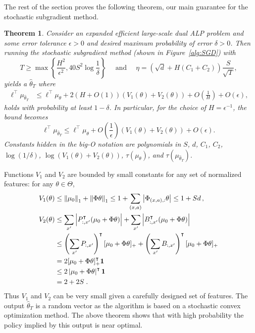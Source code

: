 \documentclass[11pt]{article}
\newtheorem{theorem}{Theorem}
\begin{document}
The rest of the section proves the following theorem, our main guarantee for the stochastic subgradient method.
\begin{theorem}
\label{thm:main_average}
Consider an expanded efficient large-scale dual ALP problem and some error tolerance $\epsilon>0$ and desired maximum probability of error $\delta>0$. Then running the stochastic subgradient method (shown in Figure~\ref{alg:SGD}) with
\[
T\geq \max\left\{\frac{H^2}{\epsilon^2}, 40S^2\log\frac{1}{\delta}\right\}
\quad\text{ and }\quad
  \eta=\left(\sqrt{d} + H (C_1 + C_2)\right)\frac{S}{\sqrt{T}},
\]
yields a $\widehat \theta_T$ where
\begin{align*}
  \ell^\top \mu_{\widehat\theta_T}
    &\leq
      \ell^\top\mu_\theta      
       +2\left(H+ O(1)\right)\left(V_1(\theta) + V_2(\theta)\right)
      + O\left(\frac{1}{H}\right)
      +O\left(\epsilon\right),      
\end{align*}
holds with probability at least $1-\delta$. In particular, for the choice of $H = \epsilon^{-1}$, the bound becomes 
\begin{equation}
  \ell^\top \mu_{\widehat\theta_T}
    \leq
    \ell^\top\mu_\theta 
      +O\left(\frac{1}{\epsilon}\right)\left(V_1(\theta) + V_2(\theta)\right)
      +O\left(\epsilon\right).
      \label{eq:exp-loss}
\end{equation}
Constants hidden in the big-O notation are polynomials in $S$, $d$, $C_1$, $C_2$, $\log(1/\delta)$, $\log(V_1(\theta)+V_2(\theta))$, $\tau(\mu_{\theta})$, and $\tau(\mu_{\widehat\theta_T})$.
\end{theorem}
Functions $V_1$ and $V_2$ are bounded by small constants for any set of normalized features: for any $\theta\in\Theta$,
\begin{align*}
V_1(\theta) &\le \left\Vert\mu_0\right\Vert_1 + \left\Vert\Phi \theta\right\Vert_1 \le 1 + \sum_{(x,a)} \left\vert\Phi_{(x,a),:} \theta\right\vert \le 1 + S d \,, \\
V_2(\theta) &\le \sum_{x'} \left\vert P_{:,x'}^\intercal ( \mu_0 + \Phi \theta) \right\vert + \sum_{x'} \left\vert B_{:,x'}^\intercal ( \mu_0 + \Phi \theta) \right\vert \\
&\le \left(\sum_{x'} P_{:,x'}\right)^\intercal [ \mu_0 + \Phi \theta ]_+ + \left(\sum_{x'} B_{:,x'}\right)^\intercal [\mu_0 + \Phi \theta]_+ \\
&= 2 [ \mu_0 + \Phi \theta ]_+^\intercal\mathbf 1 \\
&\le 2 \left\vert \mu_0 + \Phi \theta \right\vert^\intercal \mathbf 1 \\
&= 2 + 2 S \; .
\end{align*}
Thus $V_1$ and $V_2$ can be very small given a carefully designed set of features. The output $\widehat \theta_T$ is a random vector as the algorithm is based on a stochastic convex optimization method. The above theorem shows that with high probability the policy implied by this output is near optimal.
\end{document}
